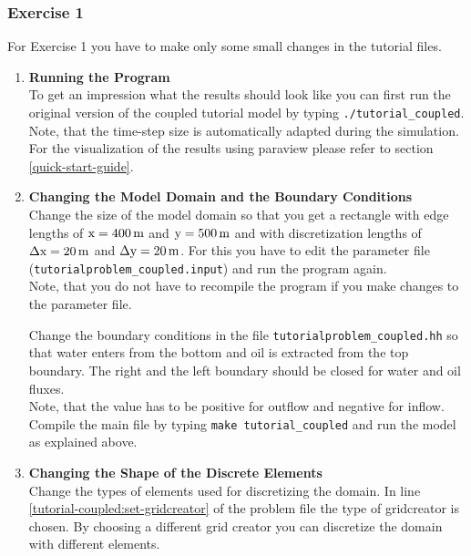 \subsubsection{Exercise 1}
\renewcommand{\labelenumi}{\alph{enumi})} For Exercise 1 you have
to make only some small changes in the tutorial files.  

\begin{enumerate}

\item \textbf{Running the Program} \\
  To get an impression what the results should look like you can first run the original version of 
the coupled tutorial model by typing  \texttt{./tutorial\_coupled}. 
Note, that the time-step size is automatically adapted during the simulation. 
For the visualization of the results using paraview please refer to section \ref{quick-start-guide}.


\item \textbf{Changing the Model Domain and the Boundary Conditions} \\
  Change the size of the model domain so that you get a rectangle with
  edge lengths of $\text{x} = \unit[400]{m}$ and $\text{y} = \unit[500]{m}$ and with
  discretization lengths of $\Delta \text{x} = \unit[20]{m}$ and $\Delta
  \text{y} = \unit[20]{m}$. For this you have to edit the parameter file (\texttt{tutorialproblem\_coupled.input}) 
  and run the program again.\\
  Note, that you do not have to recompile the program if you make changes to the parameter file.

  
  Change the boundary conditions in the file
  \texttt{tutorialproblem\_coupled.hh} so that water enters from the
  bottom and oil is extracted from the top boundary. The right and the
  left boundary should be closed for water and oil fluxes. \\
  Note, that the value has to be positive for outflow and negative for inflow.  
  Compile the main file by typing \texttt{make tutorial\_coupled} and
  run the model as explained above.

  \item \textbf{Changing  the Shape of the Discrete Elements} \\
  Change the types of elements used for discretizing the domain. In line \ref{tutorial-coupled:set-gridcreator} of the problem 
  file  the type of gridcreator is chosen. By choosing a different grid creator you can discretize the domain with different elements. 


\end{enumerate}
